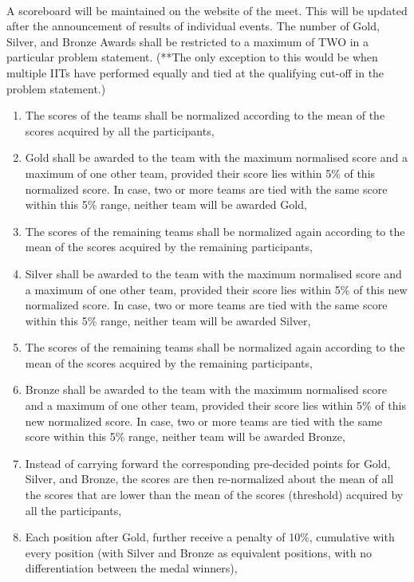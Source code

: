 
\paragraph{}
A scoreboard will be maintained on the website of the meet. This will be updated after the announcement of results of individual events. The number of Gold, Silver, and Bronze Awards shall be restricted to a maximum of TWO in a particular problem statement. (**The only exception to this would be when multiple IITs have performed equally and tied at the qualifying cut-off in the problem statement.)

\begin{enumerate}
    \item The scores of the teams shall be normalized according to the mean of the scores acquired by all the participants,
    \item Gold shall be awarded to the team with the maximum normalised score and a maximum of one other team, provided their score lies within 5\% of this normalized score. In case, two or more teams are tied with the same score within this 5\% range, neither team will be awarded Gold,
    \item The scores of the remaining teams shall be normalized again according to the mean of the scores acquired by the remaining participants, 
    \item Silver shall be awarded to the team with the maximum normalised score and a maximum of one other team, provided their score lies within 5\% of this new normalized score. In case, two or more teams are tied with the same score within this 5\% range, neither team will be awarded Silver,
    \item The scores of the remaining teams shall be normalized again according to the mean of the scores acquired by the remaining participants, 
    \item Bronze shall be awarded to the team with the maximum normalised score and a maximum of one other team, provided their score lies within 5\% of this new normalized score. In case, two or more teams are tied with the same score within this 5\% range, neither team will be awarded Bronze,
    \item Instead of carrying forward the corresponding pre-decided points for Gold, Silver, and Bronze, the scores are then re-normalized about the mean of all the scores that are lower than the mean of the scores (threshold) acquired by all the participants,
    \item Each position after Gold, further receive a penalty of 10\%, cumulative with every position (with Silver and Bronze as equivalent positions, with no differentiation between the medal winners),

\end{enumerate}

